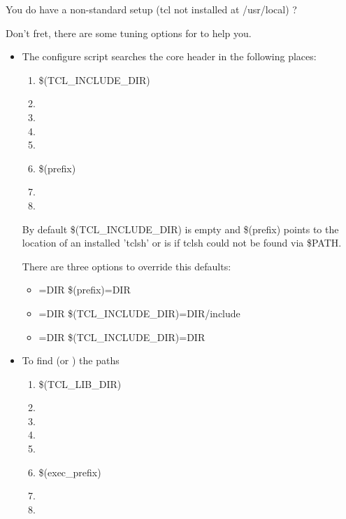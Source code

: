 \documentclass {report}
\begin{document}
You do have a non-standard setup (tcl not installed at \file
{/usr/local}) ?

Don't fret, there are some tuning options for  to help
you. 

\begin {itemize}
\item	The configure script searches the core header  in
	the following places:

	\begin {enumerate}
	\item	\$(TCL\_INCLUDE\_DIR)
	\item	{}
	\item	{}
	\item	{}
	\item	{}
	\item	\$(prefix)
	\item	{}
	\item	{}
	\end {enumerate}

	By default \$(TCL\_INCLUDE\_DIR) is empty and \$(prefix) points
	to the location of an installed 'tclsh' or is  if
	tclsh could not be found via \$PATH.

	There are three options to override this defaults:

	\begin {itemize}
	\item[]	=DIR		   \ra {} \$(prefix)=DIR
	\item[]	=DIR		   \ra {} \$(TCL\_INCLUDE\_DIR)=DIR/include
	\item[]	=DIR  \ra {} \$(TCL\_INCLUDE\_DIR)=DIR
	\end {itemize}


\item	To find  (or ) the paths

	\begin {enumerate}
	\item	\$(TCL\_LIB\_DIR)
	\item	{}
	\item	{}
	\item	{}
	\item	{}
	\item	\$(exec\_prefix)
	\item	{}
	\item	{}
	\end {enumerate}


\end{itemize}
\end{document}
